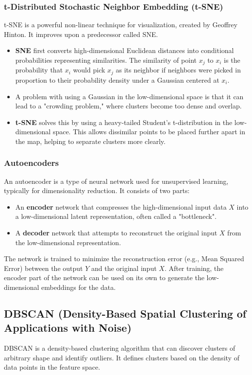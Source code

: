 \documentclass{article}
\begin{document}
\begin{multicols}{2}
	\subsubsection{t-Distributed Stochastic Neighbor Embedding (t-SNE)}
	t-SNE is a powerful non-linear technique for visualization, created by Geoffrey Hinton. It improves upon a predecessor called SNE.
	\begin{itemize}
		\item \textbf{SNE} first converts high-dimensional Euclidean distances into conditional probabilities representing similarities. The similarity of point $x_j$ to $x_i$ is the probability that $x_i$ would pick $x_j$ as its neighbor if neighbors were picked in proportion to their probability density under a Gaussian centered at $x_i$.
		\item A problem with using a Gaussian in the low-dimensional space is that it can lead to a "crowding problem," where clusters become too dense and overlap.
		\item \textbf{t-SNE} solves this by using a heavy-tailed Student's t-distribution in the low-dimensional space. This allows dissimilar points to be placed further apart in the map, helping to separate clusters more clearly.
	\end{itemize}

	\subsubsection{Autoencoders}
	An autoencoder is a type of neural network used for unsupervised learning, typically for dimensionality reduction. It consists of two parts:
	\begin{itemize}
		\item An \textbf{encoder} network that compresses the high-dimensional input data $X$ into a low-dimensional latent representation, often called a "bottleneck".
		\item A \textbf{decoder} network that attempts to reconstruct the original input $X$ from the low-dimensional representation.
	\end{itemize}
	The network is trained to minimize the reconstruction error (e.g., Mean Squared Error) between the output $Y$ and the original input $X$. After training, the encoder part of the network can be used on its own to generate the low-dimensional embeddings for the data.


	\subsection{DBSCAN (Density-Based Spatial Clustering of Applications with Noise)}
	DBSCAN is a density-based clustering algorithm that can discover clusters of arbitrary shape and identify outliers. It defines clusters based on the density of data points in the feature space.


\end{multicols}
\end{document}
